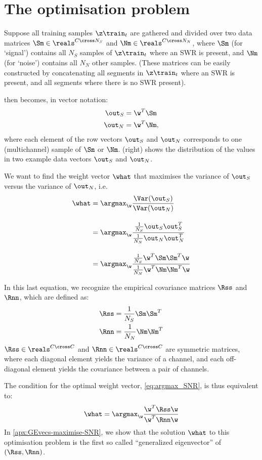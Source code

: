 \section{The optimisation problem}

Suppose all training samples $\z\train_t$ are gathered and divided over two data matrices $\Sm \in \reals^{C \cross N_S}$ and $\Nm \in \reals^{C \cross N_N}$, where $\Sm$ (for `signal') contains all $N_S$ samples of $\z\train_t$ where an SWR is present, and $\Nm$ (for `noise') contains all $N_N$ other samples. (These matrices can be easily constructed by concatenating all segments in $\z\train_t$ where an SWR is present, and all segments where there is no SWR present).

 then becomes, in vector notation:
%
\begin{align*}
\out_S &= \w^T \Sm \\
\out_N &= \w^T \Nm,
\end{align*}
where each element of the row vectors $\out_S$ and $\out_N$ corresponds to one (multichannel) sample of $\Sm$ or $\Nm$.  (right) shows the distribution of the values in two example data vectors $\out_S$ and $\out_N$.

We want to find the weight vector $\what$ that maximises the variance of $\out_S$ versus the variance of $\out_N$, i.e.
%
\begin{align}
\what &= \argmax_{\w} \frac{\Var(\out_S)}
                           {\Var(\out_N)}  \label{eq:argmax_SNR} \\[1em]
      &= \argmax_{\w} 
         \frac{\frac{1}{N_S} \out_S \out_S^T}
              {\frac{1}{N_N} \out_N \out_N^T}   \nonumber \\[1em]
      &= \argmax_{\w}
         \frac{\frac{1}{N_S} \w^T \Sm \Sm^T \w}
              {\frac{1}{N_N} \w^T \Nm \Nm^T \w}  \nonumber
\end{align}

In this last equation, we recognize the empirical covariance matrices $\Rss$ and $\Rnn$, which are defined as:
%
\begin{align}
\Rss &= \frac{1}{N_S} \Sm \Sm^T \label{eq:covariance_S}\\
\Rnn &= \frac{1}{N_N} \Nm \Nm^T \label{eq:covariance_N}
\end{align}
%
$\Rss \in \reals^{C \cross C}$ and $\Rnn \in \reals^{C \cross C}$ are symmetric matrices, where each diagonal element yields the variance of a channel, and each off-diagonal element yields the covariance between a pair of channels.

The condition for the optimal weight vector, \cref{eq:argmax_SNR}, is thus equivalent to:
%
\begin{equation}
\label{eq:argmax_R}
\what = \argmax_{\w} \frac{\w^T \Rss \w}
                          {\w^T \Rnn \w}
\end{equation}
%
In \cref{apx:GEvecs-maximise-SNR}, we show that the solution $\what$ to this optimisation problem is the first so called ``generalized eigenvector'' of $(\Rss, \Rnn)$.